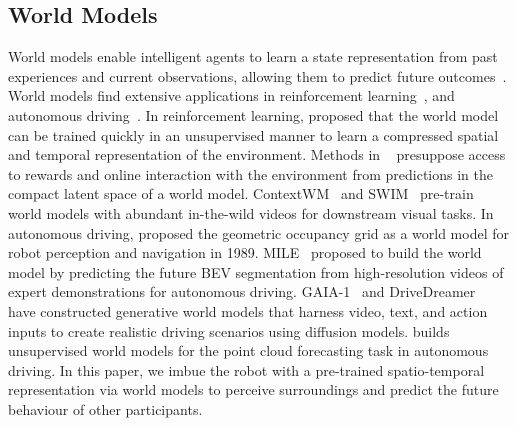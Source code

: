 \subsection{World Models}
World models enable intelligent agents to learn a state representation from past experiences and current observations, allowing them to predict future outcomes~\cite{world_models,lecun,dreamerv2}.
World models find extensive applications in reinforcement learning~\cite{dreamerv2,seo2023multi,pan2022iso}, and autonomous driving~\cite{gaia,wavbi,bogdoll2023exploring,gao2022enhance}. In reinforcement learning, \citet{world_models} proposed that the world model can be trained quickly in an unsupervised manner to learn a compressed spatial and temporal representation of the environment. Methods in ~\cite{recurrent_wm,dreamerv1,dreamerv2,dreamerv3} presuppose access to rewards and online interaction with the environment from predictions in the
compact latent space of a world model. ContextWM~\cite{contextwm} and SWIM~\cite{swim} pre-train world models with abundant in-the-wild videos for downstream visual tasks. 
In autonomous driving, \citet{occupancy} proposed the geometric occupancy grid as a world model for robot perception and navigation in 1989. MILE~\cite{mile} proposed to build the world model by predicting the future BEV segmentation from high-resolution videos of expert demonstrations for autonomous driving. GAIA-1~\cite{gaia} and DriveDreamer~\cite{drivedreamer} have constructed generative world models that harness video, text, and action inputs to create realistic driving scenarios using diffusion models. \citet{wavbi} builds unsupervised world models for the point cloud forecasting task in autonomous driving.
In this paper, we imbue the robot with a pre-trained spatio-temporal representation via world models to perceive surroundings and predict the future behaviour of other participants.